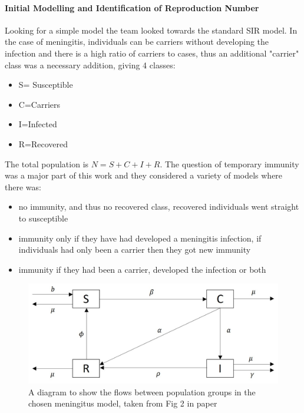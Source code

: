 \documentclass[11pt]{article} %
\begin{document}
\paragraph{Initial Modelling and Identification of Reproduction Number  }
Looking for a simple model the team looked towards the standard SIR model. In the case of meningitis, individuals can be carriers without developing the infection and there is a high ratio of carriers to cases, thus an additional "carrier" class was a necessary addition, giving 4 classes: 
\begin{itemize}
	\item S= Susceptible
	\item C=Carriers
	\item I=Infected
	\item R=Recovered
\end{itemize}
The total population is $ N=S+C+I+R $. The question of temporary immunity was a major part of this work and they considered a variety of models where there was:
\begin{itemize}
	\item no immunity, and thus no recovered class, recovered individuals went straight  to susceptible 
	\item   immunity only if they have had developed a meningitis infection, if individuals had only been a carrier then they got new immunity
	\item immunity if they had been a carrier, developed the infection or both
\end{itemize}

\begin{figure}
	\centering
	\includegraphics[width=0.9\linewidth]{Report_images/meningitis_model}
	\caption{A diagram to show the flows between population groups in the chosen meningitus model, taken from Fig 2 in paper  \cite{Irving2012}}
	\label{fig:meningitismodel}
\end{figure}
\end{document}

